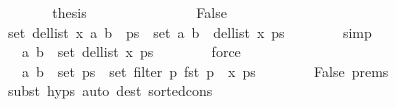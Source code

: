 \begin{isabellebody}
\ \ \ \ \isamarkupfalse%
\ \isamarkupfalse%
\ {\isacharquery}{\kern0pt}thesis\isanewline
\ \ \ \ \ \ \isacommand{{\isachardot}{\kern0pt}}\isamarkupfalse%
\isanewline
\ \ \isamarkupfalse%
\isanewline
\ \ \ \ \isamarkupfalse%
\ False\isanewline
\ \ \ \ \isamarkupfalse%
\ {\isachardoublequoteopen}set\ {\isacharparenleft}{\kern0pt}del{\isacharunderscore}{\kern0pt}list\ x\ {\isacharparenleft}{\kern0pt}{\isacharparenleft}{\kern0pt}a{\isacharcomma}{\kern0pt}\ b{\isacharparenright}{\kern0pt}\ {\isacharhash}{\kern0pt}\ ps{\isacharparenright}{\kern0pt}{\isacharparenright}{\kern0pt}\ {\isacharequal}{\kern0pt}\ set\ {\isacharparenleft}{\kern0pt}{\isacharparenleft}{\kern0pt}a{\isacharcomma}{\kern0pt}\ b{\isacharparenright}{\kern0pt}\ {\isacharhash}{\kern0pt}\ del{\isacharunderscore}{\kern0pt}list\ x\ ps{\isacharparenright}{\kern0pt}{\isachardoublequoteclose}\isanewline
\ \ \ \ \ \ \isamarkupfalse%
\ simp\isanewline
\ \ \ \ \isamarkupfalse%
\ \isamarkupfalse%
\ {\isachardoublequoteopen}{\isachardot}{\kern0pt}{\isachardot}{\kern0pt}{\isachardot}{\kern0pt}\ {\isacharequal}{\kern0pt}\ {\isacharbraceleft}{\kern0pt}{\isacharparenleft}{\kern0pt}a{\isacharcomma}{\kern0pt}\ b{\isacharparenright}{\kern0pt}{\isacharbraceright}{\kern0pt}\ {\isasymunion}\ set\ {\isacharparenleft}{\kern0pt}del{\isacharunderscore}{\kern0pt}list\ x\ ps{\isacharparenright}{\kern0pt}{\isachardoublequoteclose}\isanewline
\ \ \ \ \ \ \isamarkupfalse%
\ force\isanewline
\ \ \ \ \isamarkupfalse%
\ \isamarkupfalse%
\ {\isachardoublequoteopen}{\isachardot}{\kern0pt}{\isachardot}{\kern0pt}{\isachardot}{\kern0pt}\ {\isacharequal}{\kern0pt}\ {\isacharbraceleft}{\kern0pt}{\isacharparenleft}{\kern0pt}a{\isacharcomma}{\kern0pt}\ b{\isacharparenright}{\kern0pt}{\isacharbraceright}{\kern0pt}\ {\isasymunion}\ set\ ps\ {\isacharminus}{\kern0pt}\ set\ {\isacharparenleft}{\kern0pt}filter\ {\isacharparenleft}{\kern0pt}{\isasymlambda}p{\isachardot}{\kern0pt}\ fst\ p\ {\isacharequal}{\kern0pt}\ x{\isacharparenright}{\kern0pt}\ ps{\isacharparenright}{\kern0pt}{\isachardoublequoteclose}\isanewline
\ \ \ \ \ \ \isamarkupfalse%
\ False\ {\isachardoublequoteopen}{}{\isachardot}{\kern0pt}prems{\isachardoublequoteclose}\isanewline
\ \ \ \ \ \ \isamarkupfalse%
\ {\isacharparenleft}{\kern0pt}subst\ {\isachardoublequoteopen}{}{\isachardot}{\kern0pt}hyps{\isachardoublequoteclose}{\isacharparenright}{\kern0pt}\ {\isacharparenleft}{\kern0pt}auto\ dest{\isacharcolon}{\kern0pt}\ sorted{\isacharunderscore}{\kern0pt}cons{\isacharparenright}{\kern0pt}\isanewline

\end{isabellebody}
